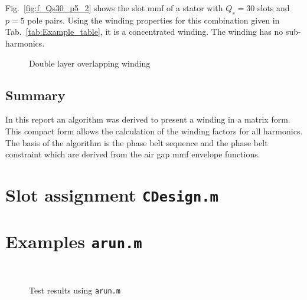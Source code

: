 Fig.~\ref{fig:f_Qs30_p5_2} shows the slot mmf of a stator with $Q_s=30$ slots and $p=5$ pole pairs. Using the winding properties for this combination given in Tab.~\ref{tab:Example_table}, it is a concentrated winding. The winding has no sub-harmonics. 
\begin{figure}[htbp]
	\centering
  \fontsize{6}{6}\selectfont
	\hfill
	\caption{Double layer overlapping winding}
	\label{Main_double_overlapping}
\end{figure}

\clearpage
\section{Summary}
In this report an algorithm was derived to present a winding in a matrix form. This compact form allows the calculation of the winding factors for all harmonics. The basis of the algorithm is the phase belt sequence and the phase belt constraint which are derived from the air gap mmf envelope functions. 

\appendix

\chapter{Slot assignment \texttt{CDesign.m}}\label{sec:malg}


\chapter{Examples \texttt{arun.m}}\label{sec:mex}


\begin{figure}[htbp]
\centering
\fontsize{8}{0}\selectfont
\setlength{}
\subfloat{
}
\hfill
\setlength{}
\subfloat{
}
\\
\fontsize{8}{0}\selectfont
\setlength{}
\subfloat{
}
\hfill
\fontsize{8}{0}\selectfont
\setlength{}
\subfloat{
}
\caption{Test results using \texttt{arun.m}}
\label{fig:tests}
\end{figure}